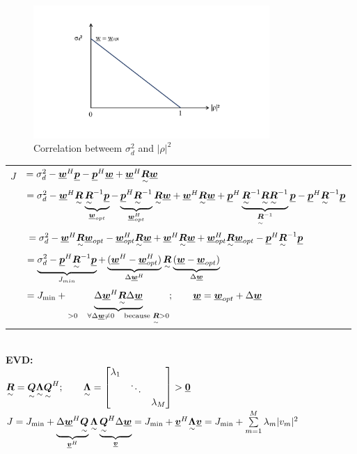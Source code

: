 \begin{figure}[htbp]
	\centering
		\includegraphics[trim =1cm 2cm 4cm 2cm, clip, width=0.80\textwidth]{graphics/diagram_rho_vs_sigma.pdf}
	\caption{Correlation betweem $\sigma_d^2$ and $|\rho|^2$}
	\label{fig:diagram_rho_vs_sigma}
\end{figure}

\begin{doublespace}
\begin{tabular}{ll}
$J$&$=\sigma_d^2 - \vec{w}^H\vec{p} - \vec{p}^H \vec{w} + \vec{w}^H \ma{R}\vec{w}$\\
&$=\sigma_d^2 - \vec{w}^H\ma{R}\underbrace{\ma{R}^{-1}\vec{p}}_{\vec{w}_{opt}} - \underbrace{\vec{p}^H \ma{R}^{-1}}
_{\vec{w}^H_{opt}} \ma{R} \vec{w} + \vec{w}^H \ma{R}\vec{w} + \vec{p}^H \underbrace{\ma{R}^{-1}\ma{R}\ma{R}^{-1}}_{\ma{R}^{-1}}\vec{p} - \vec{p}^H\ma{R}^{-1}\vec{p}$\\
&$=\sigma_d^2 - \vec{w}^H\ma{R}\vec{w}_{opt} - \vec{w}^H_{opt}\ma{R}\vec{w} + \vec{w}^H\ma{R}\vec{w} + \vec{w}^H_{opt}\ma{R}\vec{w}_{opt} - \vec{p}^H\ma{R}^{-1}\vec{p}$\\
&$=\underbrace{\sigma_d^2 - \vec{p}^H\ma{R}^{-1}\vec{p}}_{J_{min}} + \underbrace{(\vec{w}^H-\vec{w}^H_{opt})}_{\Delta\vec{w}^H}\ma{R} \underbrace{(\vec{w} - \vec{w}_{opt})}_{\Delta\vec{w}}$\\
&$=J_{\text{min}} + \underbrace{\Delta\vec{w}^H\ma{R}\Delta\vec{w}}_{>0 \quad \forall \Delta\vec{w}\neq 0 \quad \text{because } \ma{R}>0}; \qquad \vec{w}=\vec{w}_{opt} + \Delta\vec{w}$
\end{tabular}\\
\textbf{EVD:}\\
$\ma{R} = \ma{Q} \ma{\Lambda} \ma{Q}^H; \qquad \ma{\Lambda} = \mat{\lambda_1 & & \\ & \ddots &\\ & & \lambda_M} > \vec{0}$\\
$J=J_{\text{min}} + \underbrace{\Delta\vec{w}^H \ma{Q}}_{\vec{v}^H} \ma{\Lambda} \underbrace{\ma{Q}^H \Delta\vec{w}}_{\vec{v}} = J_{\text{min}} + \vec{v}^H \ma{\Lambda} \vec{v} = J_{\text{min}} + \sum\limits_{m=1}^{M} \lambda_m |v_m|^2$\\
\end{doublespace}

